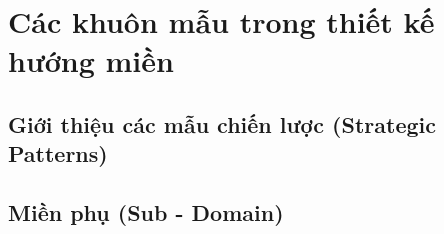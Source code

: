 \documentclass[oneside]{report} %
\begin{document}
% 

\section{Các khuôn mẫu trong thiết kế hướng miền}

% 

\subsection{Giới thiệu các mẫu chiến lược (Strategic Patterns)}

% 

\subsection{Miền phụ (Sub - Domain)}

% 


% 


% 


% 


% 


\end{document}
